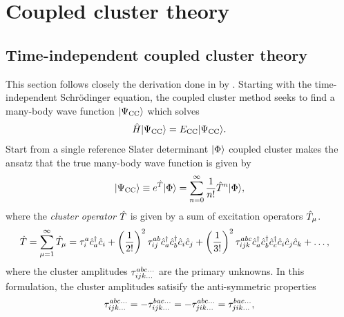 \chapter{Coupled cluster theory}


    \section{Time-independent coupled cluster theory}
        This section follows closely the derivation done in
         by
        \citeauthor{crawford2000introduction} \cite{crawford2000introduction}.
        Starting with the time-independent Schrödinger equation, the coupled
        cluster method seeks to find a many-body wave function $| \Psi_{\text{CC}} \rangle$ which
        solves
        \begin{align}
            \hat{H}| \Psi_{\text{CC}} \rangle = E_{\text{CC}}| \Psi_{\text{CC}} \rangle.
        \end{align}
        Start from a single reference Slater determinant $| \Phi \rangle$ coupled
        cluster makes the ansatz that the true many-body wave function is given
        by
        \begin{align}
            | \Psi_{\text{CC}} \rangle \equiv e^{\hat{T}}| \Phi \rangle
            = \sum_{n = 0}^{\infty}\frac{1}{n!}\hat{T}^n| \Phi \rangle,
            \label{eq:cc_wave_function}
        \end{align}
        where the \emph{cluster operator} $\hat{T}$ is given by a sum of excitation
        operators $\hat{T}_{\mu}$.
        \begin{align}
            \hat{T} &= \sum_{\mu = 1}^{\infty} \hat{T}_{\mu}
            = \tau^a_i\hat{c}_{a}^{\dagger}\hat{c}_{i}
            + \left( \frac{1}{2!} \right)^2\tau^{ab}_{ij}\hat{c}_{a}^{\dagger}\hat{c}_{b}^{\dagger}\hat{c}_{i}\hat{c}_{j}
            + \left( \frac{1}{3!} \right)^2\tau^{abc}_{ijk}
            \hat{c}_{a}^{\dagger}\hat{c}_{b}^{\dagger}\hat{c}_{c}^{\dagger}\hat{c}_{i}\hat{c}_{j}\hat{c}_{k}
            + \dots,
            \label{eq:cluster-operator}
        \end{align}
        where the cluster amplitudes $\tau^{abc\dots}_{ijk\dots}$ are the
        primary unknowns.
        In this formulation, the cluster amplitudes satisify the anti-symmetric
        properties
        \begin{align}
            \tau^{abc\dots}_{ijk\dots}
            = -\tau^{bac\dots}_{ijk\dots}
            = -\tau^{abc\dots}_{jik\dots}
            = \tau^{bac\dots}_{jik\dots},
        \end{align}
